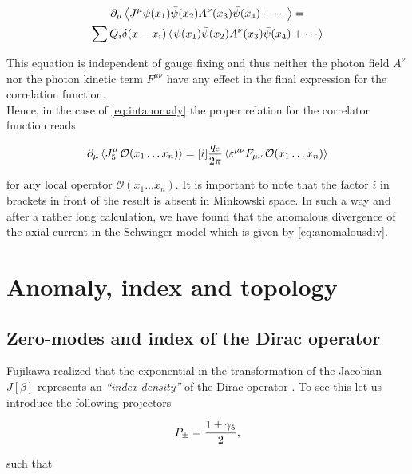 \begin{multline}
   \partial_\mu \expval{J^\mu\psi(x_1)\bar\psi(x_2)A^\nu(x_3)\bar\psi(x_4)+\cdots} =\\
    \sum Q_i \delta(x-x_i)\expval{\psi(x_1)\bar\psi(x_2)A^\nu(x_3)\bar\psi(x_4)+\cdots}
\end{multline}

This equation is independent of gauge fixing and thus neither the photon field $A^\nu$ nor the photon kinetic term $F^{\mu\nu}$ have any effect in the final expression for the correlation function.\\

Hence, in the case of \eqref{eq:intanomaly} the proper relation for the correlator function reads


\begin{equation}
    \partial_\mu \expval{J_5^\mu \,\mathcal{O}(x_1\ldots x_n)} = [i]\frac{q_e}{2\pi}\expval{\varepsilon^{\mu\nu}F_{\mu\nu}\, \mathcal{O}(x_1\ldots x_n)}
    \label{eq:anomalousdiv}
\end{equation}

for any local operator $\mathcal{O}(x_1\ldots x_n)$. It is important to note that the factor $i$ in brackets in front of the result is absent in Minkowski space. In such a way and after a rather long calculation, we have found that the anomalous divergence of the axial current in the Schwinger model which is given by \eqref{eq:anomalousdiv}.




\section{Anomaly, index and topology}\label{sec:topology}

\subsection{Zero-modes and index of the Dirac operator}\label{ssec:ZeroModesIndex}

Fujikawa realized that the exponential in the transformation of the Jacobian $J[\beta]$ represents an \emph{``index density''} of the Dirac operator \cite{Fujikawa1980}. To see this let us introduce the following projectors

\begin{equation}
    P_{\pm} = \frac{1\pm\gamma_5}{2},
\end{equation}

such that

